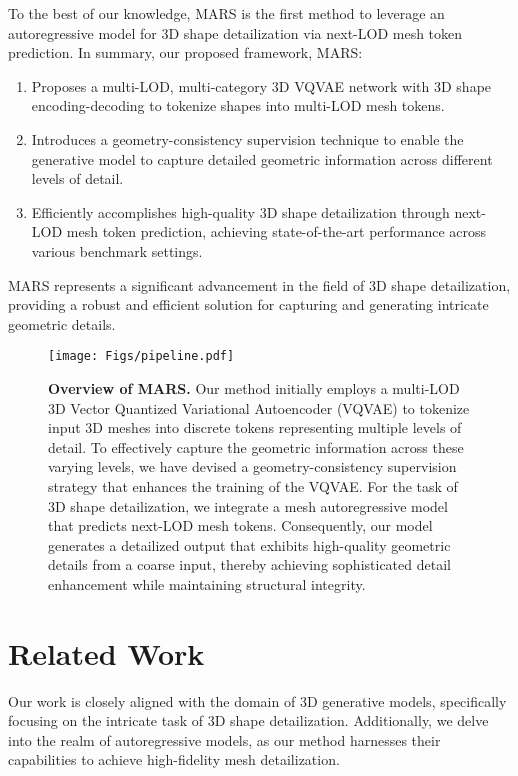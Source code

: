 To the best of our knowledge, MARS is the first method to leverage an autoregressive model for 3D shape detailization via next-LOD mesh token prediction. In summary, our proposed framework, MARS:
\begin{enumerate}
    \item Proposes a multi-LOD, multi-category 3D VQVAE network with 3D shape encoding-decoding to tokenize shapes into multi-LOD mesh tokens.
    \item Introduces a geometry-consistency supervision technique to enable the generative model to capture detailed geometric information across different levels of detail.
    \item Efficiently accomplishes high-quality 3D shape detailization through next-LOD mesh token prediction, achieving state-of-the-art performance across various benchmark settings.
\end{enumerate}

MARS represents a significant advancement in the field of 3D shape detailization, providing a robust and efficient solution for capturing and generating intricate geometric details.

\begin{figure*}
    \centering
    \texttt{[image: Figs/pipeline.pdf]}
    \caption{\textbf{Overview of MARS.} Our method initially employs a multi-LOD 3D Vector Quantized Variational Autoencoder (VQVAE) to tokenize input 3D meshes into discrete tokens representing multiple levels of detail. To effectively capture the geometric information across these varying levels, we have devised a geometry-consistency supervision strategy that enhances the training of the VQVAE. For the task of 3D shape detailization, we integrate a mesh autoregressive model that predicts next-LOD mesh tokens. Consequently, our model generates a detailized output that exhibits high-quality geometric details from a coarse input, thereby achieving sophisticated detail enhancement while maintaining structural integrity.}
    \label{fig:process}
\end{figure*}


\section{Related Work}
Our work is closely aligned with the domain of 3D generative models, specifically focusing on the intricate task of 3D shape detailization. Additionally, we delve into the realm of autoregressive models, as our method harnesses their capabilities to achieve high-fidelity mesh detailization.


